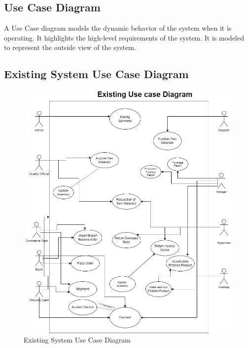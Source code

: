 \documentclass{article}
\begin{document}
\subsection{Use Case Diagram}
A Use Case diagram models the dynamic behavior of the system when it is operating. It highlights the high-level requirements of the system. It is modeled to represent the outside view of the system.
\subsection{Existing System Use Case Diagram}
\begin{figure}[h]
    \centering
    \includegraphics[width=13cm,height=13cm]{img/existingusecas.png}
    \caption{Existing System Use Case Diagram}
    \label{fig:my_label}
\end{figure}
\newpage
\end{document}
